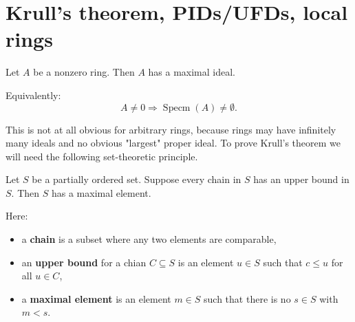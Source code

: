 \documentclass[11pt]{article}
\begin{document}
\section{Krull's theorem, PIDs/UFDs, local rings}

\begin{thm}
    Let $A$ be a nonzero ring. Then $A$ has a maximal 
    ideal. 

    Equivalently: 
    \[
        A \neq 0 
        \Rightarrow \operatorname{Specm}(A) \neq \emptyset. 
    \]
\end{thm}
This is not at all obvious for arbitrary rings, because 
rings may have infinitely many ideals and no obvious "largest" 
proper ideal. To prove Krull's theorem we will need 
the following set-theoretic principle. 

\begin{lem}
    Let $S$ be a partially ordered set. Suppose 
    every chain in $S$ has an upper bound in $S$. 
    Then $S$ has a maximal element. 
\end{lem}

Here: 
\begin{itemize}
    \item a \textbf{chain} is a subset where any 
        two elements are comparable, 
    \item an \textbf{upper bound} for a chian 
        $C \subseteq S$ is an element $u \in S$ such 
        that $c \leq u$ for all $u \in C$, 
    \item a \textbf{maximal element} is an element 
        $m \in S$ such that there is no $s \in S$ 
        with $m < s$. 
\end{itemize}
\end{document}
